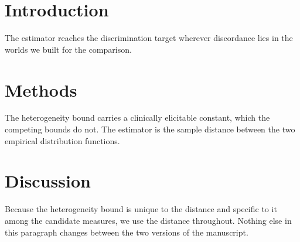 \documentclass{article}
\begin{document}
\section{Introduction}\label{sec:intro}
The estimator reaches the discrimination target wherever discordance lies in the worlds we built for the comparison.
\section{Methods}\label{sec:methods}
The heterogeneity bound carries a clinically elicitable constant, which the competing bounds do not. The estimator is the sample distance between the two empirical distribution functions.
\section{Discussion}\label{sec:discussion}
Because the heterogeneity bound is unique to the distance and specific to it among the candidate measures, we use the distance throughout. Nothing else in this paragraph changes between the two versions of the manuscript.
\end{document}
